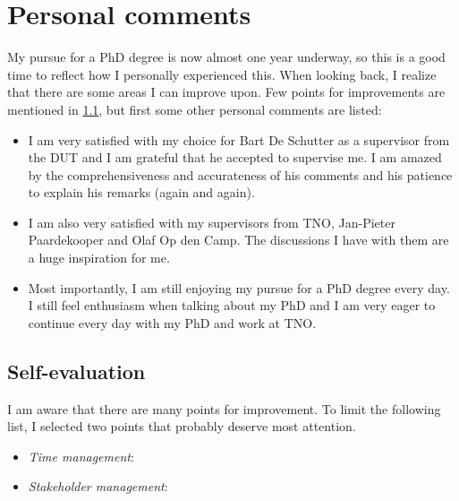 \section{Personal comments}
\label{sec:personal}

My pursue for a PhD degree is now almost one year underway, so this is a good time to reflect how I personally experienced this. When looking back, I realize that there are some areas I can improve upon. Few points for improvements are mentioned in \cref{sec:evaluation}, but first some other personal comments are listed:
\begin{itemize}
	\item I am very satisfied with my choice for Bart De Schutter as a supervisor from the DUT and I am grateful that he accepted to supervise me. I am amazed by the comprehensiveness and accurateness of his comments and his patience to explain his remarks (again and again).
	\item I am also very satisfied with my supervisors from TNO, Jan-Pieter Paardekooper and Olaf Op den Camp. The discussions I have with them are a huge inspiration for me.
	\item Most importantly, I am still enjoying my pursue for a PhD degree every day. I still feel enthusiasm when talking about my PhD and I am very eager to continue every day with my PhD and work at TNO. 
\end{itemize}

\subsection{Self-evaluation}
\label{sec:evaluation}

I am aware that there are many points for improvement. To limit the following list, I selected two points that probably deserve most attention.

\begin{itemize}
	\item \emph{Time management}:
	\item \emph{Stakeholder management}:
\end{itemize}

